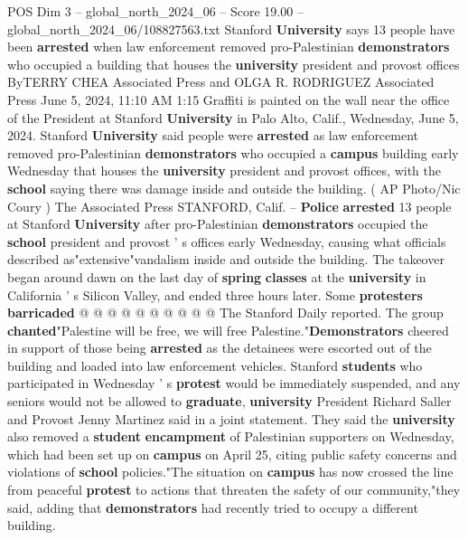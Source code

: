 \begin{textsample}{POS Dim 3 – global\_north\_2024\_06 – Score 19.00 – global\_north\_2024\_06/108827563.txt}  \label{ex:f3_pos_076}
Stanford \textbf{University} says 13 people have been \textbf{arrested} when law enforcement removed pro-Palestinian \textbf{demonstrators} who occupied a building that houses the \textbf{university} president and provost offices ByTERRY CHEA Associated Press and OLGA R.
RODRIGUEZ Associated Press June 5, 2024, 11:10 AM 1:15 Graffiti is painted on the wall near the office of the President at Stanford \textbf{University} in Palo Alto, Calif., Wednesday, June 5, 2024.
Stanford \textbf{University} said people were \textbf{arrested} as law enforcement removed pro-Palestinian \textbf{demonstrators} who occupied a \textbf{campus} building early Wednesday that houses the \textbf{university} president and provost offices, with the \textbf{school} saying there was damage inside and outside the building. ( AP Photo/Nic Coury ) The Associated Press STANFORD, Calif. -- \textbf{Police} \textbf{arrested} 13 people at Stanford \textbf{University} after pro-Palestinian \textbf{demonstrators} occupied the \textbf{school} president and provost ' s offices early Wednesday, causing what officials described as"extensive"vandalism inside and outside the building.
The takeover began around dawn on the last day of \textbf{spring} \textbf{classes} at the \textbf{university} in California ' s Silicon Valley, and ended three hours later.
Some \textbf{protesters} \textbf{barricaded} @ @ @ @ @ @ @ @ @ @ The Stanford Daily reported.
The group \textbf{chanted}"Palestine will be free, we will free Palestine."\textbf{Demonstrators} cheered in support of those being \textbf{arrested} as the detainees were escorted out of the building and loaded into law enforcement vehicles.
Stanford \textbf{students} who participated in Wednesday ' s \textbf{protest} would be immediately suspended, and any seniors would not be allowed to \textbf{graduate}, \textbf{university} President Richard Saller and Provost Jenny Martinez said in a joint statement.
They said the \textbf{university} also removed a \textbf{student} \textbf{encampment} of Palestinian supporters on Wednesday, which had been set up on \textbf{campus} on April 25, citing public safety concerns and violations of \textbf{school} policies."The situation on \textbf{campus} has now crossed the line from peaceful \textbf{protest} to actions that threaten the safety of our community,"they said, adding that \textbf{demonstrators} had recently tried to occupy a different building.

\end{textsample}

